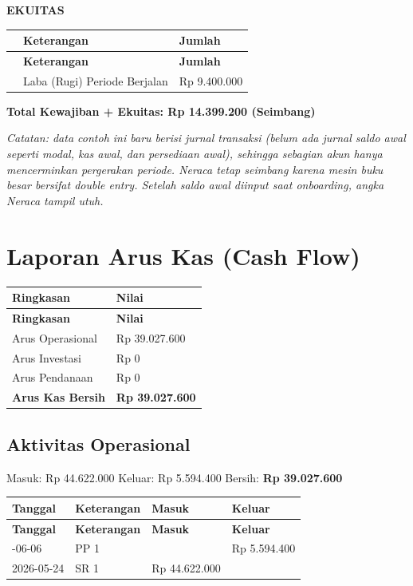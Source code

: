 \documentclass[11pt,a4paper]{article}
\begin{document}
\textbf{EKUITAS}
{\setlength{\tabcolsep}{5pt}
\begin{longtable}{l l R{3cm}}
\toprule
\textbf{} & \textbf{Keterangan} & \textbf{Jumlah} \\
\midrule\endfirsthead
\toprule
\textbf{} & \textbf{Keterangan} & \textbf{Jumlah} \\
\midrule\endhead
\bottomrule\endfoot
 & Laba (Rugi) Periode Berjalan & Rp 9.400.000 \\
\end{longtable}}

\vspace{2pt}\noindent\colorbox{soft}{\parbox{\dimexpr\linewidth-2\fboxsep}{\textbf{Total Kewajiban + Ekuitas: Rp 14.399.200 (Seimbang)}}}\vspace{4pt}

\textit{\small Catatan: data contoh ini baru berisi jurnal transaksi (belum ada jurnal saldo awal seperti modal, kas awal, dan persediaan awal), sehingga sebagian akun hanya mencerminkan pergerakan periode. Neraca tetap seimbang karena mesin buku besar bersifat double entry. Setelah saldo awal diinput saat onboarding, angka Neraca tampil utuh.}

\section{Laporan Arus Kas (Cash Flow)}
{\setlength{\tabcolsep}{5pt}
\begin{longtable}{l R{3cm}}
\toprule
\textbf{Ringkasan} & \textbf{Nilai} \\
\midrule\endfirsthead
\toprule
\textbf{Ringkasan} & \textbf{Nilai} \\
\midrule\endhead
\bottomrule\endfoot
Arus Operasional & Rp 39.027.600 \\
Arus Investasi & Rp 0 \\
Arus Pendanaan & Rp 0 \\
\textbf{Arus Kas Bersih} & \textbf{Rp 39.027.600} \\
\end{longtable}}

\subsection{Aktivitas Operasional}
Masuk: Rp 44.622.000 \quad Keluar: Rp 5.594.400 \quad Bersih: \textbf{Rp 39.027.600}

{\setlength{\tabcolsep}{5pt}
\begin{longtable}{l l R{2.6cm} R{2.6cm}}
\toprule
\textbf{Tanggal} & \textbf{Keterangan} & \textbf{Masuk} & \textbf{Keluar} \\
\midrule\endfirsthead
\toprule
\textbf{Tanggal} & \textbf{Keterangan} & \textbf{Masuk} & \textbf{Keluar} \\
\midrule\endhead
\bottomrule{}-06-06 & PP 1 &  & Rp 5.594.400 \\
2026-05-24 & SR 1 & Rp 44.622.000 &  \\
\end{longtable}}
\end{document}
